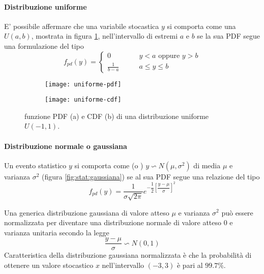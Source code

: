 		\paragraph{Distribuzione uniforme} E' possibile affermare che una variabile stocastica $y$ si comporta come una  $U(a,b)$, mostrata in figura \ref{fig:stat:uniforme}, nell'intervallo di estremi $a$ e $b$ se la sua PDF segue una formulazione del tipo
		\begin{equation}
			f_{pd}(y) = \begin{cases}
				0 & y < a \textrm{ oppure } y > b \\
				\frac{1}{b-a} \qquad & a\leq y\leq b
			\end{cases}
		\end{equation}
		
		\begin{figure}[bht]
			\centering
			\begin{subfigure}{0.48\linewidth}
				\centering
				\texttt{[image: uniforme-pdf]} \caption{}
			\end{subfigure}
			\begin{subfigure}{0.48\linewidth}
				\centering
				\texttt{[image: uniforme-cdf]} \caption{}
			\end{subfigure}
			\caption{funzione PDF (a) e CDF (b) di una distribuzione uniforme $U(-1,1)$.}
			\label{fig:stat:uniforme}
		\end{figure}
		
		\paragraph{Distribuzione normale o gaussiana} Un evento statistico $y$ si comporta come  (o ) $y \backsim N(\mu , \sigma^2)$ di media $\mu$ e varianza $\sigma^2$ (figura \ref{fig:stat:gaussiana}) se al sua PDF segue una relazione del tipo
		\begin{equation}
			f_{pd}(y) = \frac 1 {\sigma \sqrt{2\pi}} e^{-\dfrac 1 2 \left[\dfrac{y-\mu}{\sigma}\right]^2}
		\end{equation}
		
		Una generica distribuzione gaussiana di valore atteso $\mu$ e varianza $\sigma^2$ può essere normalizzata per diventare una distribuzione normale di valore atteso $0$ e varianza unitaria secondo la legge
		\begin{equation}
			\frac{y -\mu}{\sigma} \backsim N(0,1)
		\end{equation}
		Caratteristica della distribuzione gaussiana normalizzata è che la probabilità di ottenere un valore stocastico $x$ nell'intervallo $(-3,3)$ è pari al $99.7\%$.
		
